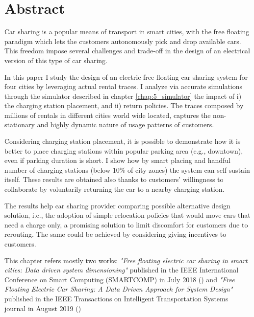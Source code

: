 \section{Abstract}

Car sharing is a popular means of transport in smart cities, with the free floating paradigm which lets the customers autonomously pick and drop available cars. This freedom impose several challenges and trade-off in the design of an electrical version of this type of car sharing. 

In this paper I study the design of an electric free floating car sharing system for four cities by leveraging actual rental traces. I analyze via accurate simulations through the simulator described in chapter \ref{chap:5_simulator} the impact of i) the charging station placement, and ii) return policies.
The traces composed by millions of rentals in different cities world wide located, captures the non-stationary and highly dynamic nature of usage patterns of customers.

Considering charging station placement, it is possible to demonstrate how it is better to place charging stations within popular parking area (e.g., downtown), even if parking duration is short. I show how by smart placing and handful number of charging stations (below 10\% of city zones) the system can self-sustain itself. 
These results are obtained also thanks to customers' willingness to collaborate by voluntarily returning the car to a nearby charging station.

The results help car sharing provider comparing possible alternative design solution, i.e.,  the adoption of simple relocation policies that would move cars that need a charge only, a promising solution to limit discomfort for customers due to rerouting. The same could be achieved by considering giving incentives to customers. 

This chapter refers mostly two works: \textit{"Free floating electric car sharing in smart cities: Data driven system dimensioning"} published in the IEEE International Conference on Smart Computing (SMARTCOMP) in July 2018 (\cite{taormina}) and \textit{"Free Floating Electric Car Sharing: A Data Driven Approach for System Design"} published in the IEEE Transactions on Intelligent Transportation Systems journal in August 2019 (\cite{coccacar})
